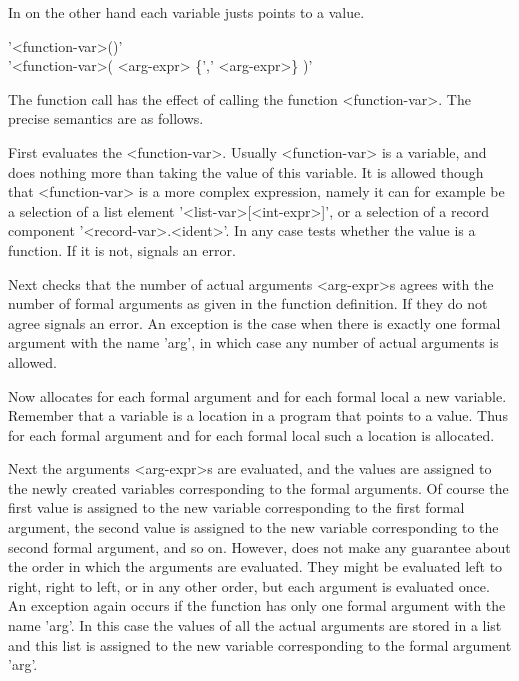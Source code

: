 In {\GAP} on the other hand each variable justs points to a value.


'<function-var>()' \\
'<function-var>( <arg-expr> \{',' <arg-expr>\} )'

The function call has the effect  of calling the function <function-var>.
The precise semantics are as follows.

First  {\GAP} evaluates the <function-var>.  Usually  <function-var> is a
variable,  and  {\GAP} does nothing more  than taking  the value of  this
variable.   It is allowed  though  that  <function-var> is a more complex
expression,  namely it can for example be  a selection of  a list element
'<list-var>[<int-expr>]',  or   a   selection  of   a   record  component
'<record-var>.<ident>'.  In any  case {\GAP} tests whether the value is a
function.  If it is not, {\GAP} signals an error.

Next {\GAP} checks that the number of actual arguments <arg-expr>s agrees
with the number of formal arguments as given  in the function definition.
If they do not agree {\GAP}  signals an error.  An  exception is the case
when there is  exactly one formal argument  with the name 'arg', in which
case any number of actual arguments is allowed.

Now {\GAP} allocates for each formal argument and for each formal local a
new variable.  Remember that a variable is a location in a {\GAP} program
that points  to  a value.  Thus for   each formal argument  and  for each
formal local such a location is allocated.

Next the arguments <arg-expr>s are evaluated, and the values are assigned
to the newly created variables corresponding to the formal arguments.  Of
course the first value  is assigned  to the new variable corresponding to
the  first  formal argument, the second   value   is  assigned to the new
variable corresponding   to   the second    formal argument, and   so on.
However, {\GAP} does not make any guarantee about the order  in which the
arguments are evaluated.  They might be evaluated left to right, right to
left, or in  any  other order, but  each  argument is evaluated once.  An
exception again occurs if the function has  only one formal argument with
the name 'arg'.  In this case the values  of all the actual arguments are
stored  in   a  list and this   list  is assigned  to the    new variable
corresponding to the formal argument 'arg'.

